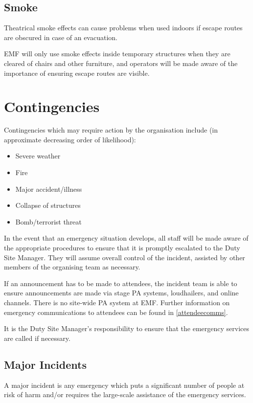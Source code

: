 \subsection{Smoke}
Theatrical smoke effects can cause problems when used indoors if escape
routes are obscured in case of an evacuation.

EMF will only use smoke effects inside temporary structures when they are
cleared of chairs and other furniture, and operators will be made aware of
the importance of ensuring escape routes are visible.

\newpage

\section{Contingencies}\label{contingencies}
Contingencies which may require action by the organisation include (in
approximate decreasing order of likelihood):

\begin{itemize}
\tightlist
  \item Severe weather
  \item Fire
  \item Major accident/illness
  \item Collapse of structures
  \item Bomb/terrorist threat
\end{itemize}

In the event that an emergency situation develops, all staff will be made aware of
the appropriate procedures to ensure that it is promptly escalated to the Duty Site Manager.
They will assume overall control of the incident, assisted by other members of the organising
team as necessary.

If an announcement has to be made to attendees, the incident team is able to
ensure announcements are made via stage PA systems, loudhailers, and online channels.
There is no site-wide PA system at EMF\@. Further information on emergency communications
to attendees can be found in \cref{attendeecomms}.

It is the Duty Site Manager's responsibility to ensure that the emergency services
are called if necessary.

\subsection{Major Incidents}
A major incident is any emergency which puts a significant number of people at risk
of harm and/or requires the large-scale assistance of the emergency services.

